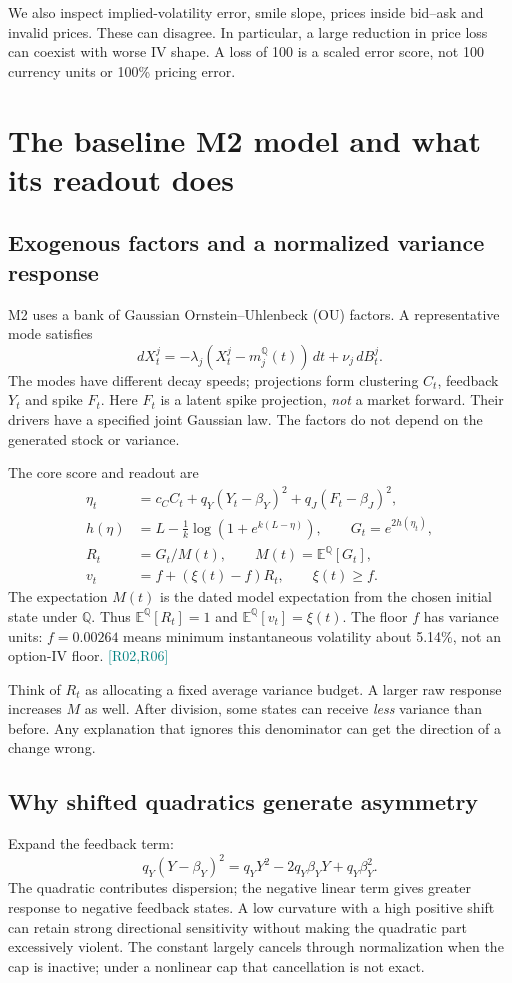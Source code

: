 \documentclass[11pt,a4paper]{article}
\newcommand{\E}{\mathbb E^{\mathbb Q}}
\newcommand{\src}[1]{\textcolor{teal}{\small[#1]}}
\begin{document}
We also inspect implied-volatility error, smile slope, prices inside bid--ask and invalid prices. These can disagree. In particular, a large reduction in price loss can coexist with worse IV shape. A loss of 100 is a scaled error score, not 100 currency units or 100\% pricing error.

\section{The baseline M2 model and what its readout does}
\subsection{Exogenous factors and a normalized variance response}
M2 uses a bank of Gaussian Ornstein--Uhlenbeck (OU) factors. A representative mode satisfies
\begin{equation}
dX_t^j=-\lambda_j(X_t^j-m_j^{\mathbb Q}(t))\,dt+\nu_j\,dB_t^j.
\end{equation}
The modes have different decay speeds; projections form clustering $C_t$, feedback $Y_t$ and spike $F_t$. Here $F_t$ is a latent spike projection, \emph{not} a market forward. Their drivers have a specified joint Gaussian law. The factors do not depend on the generated stock or variance.

The core score and readout are
\begin{align}
\eta_t&=c_C C_t+q_Y(Y_t-\beta_Y)^2+q_J(F_t-\beta_J)^2,\\
h(\eta)&=L-\frac1k\log(1+e^{k(L-\eta)}),\qquad G_t=e^{2h(\eta_t)},\\
R_t&=G_t/M(t),\qquad M(t)=\E[G_t],\\
v_t&=f+(\xi(t)-f)R_t,\qquad \xi(t)\geq f.
\end{align}
The expectation $M(t)$ is the dated model expectation from the chosen initial state under $\mathbb Q$. Thus $\E[R_t]=1$ and $\E[v_t]=\xi(t)$. The floor $f$ has variance units: $f=0.00264$ means minimum instantaneous volatility about 5.14\%, not an option-IV floor. \src{R02,R06}

Think of $R_t$ as allocating a fixed average variance budget. A larger raw response increases $M$ as well. After division, some states can receive \emph{less} variance than before. Any explanation that ignores this denominator can get the direction of a change wrong.

\subsection{Why shifted quadratics generate asymmetry}
Expand the feedback term:
\begin{equation}
q_Y(Y-\beta_Y)^2=q_YY^2-2q_Y\beta_YY+q_Y\beta_Y^2.
\end{equation}
The quadratic contributes dispersion; the negative linear term gives greater response to negative feedback states. A low curvature with a high positive shift can retain strong directional sensitivity without making the quadratic part excessively violent. The constant largely cancels through normalization when the cap is inactive; under a nonlinear cap that cancellation is not exact.
\end{document}
